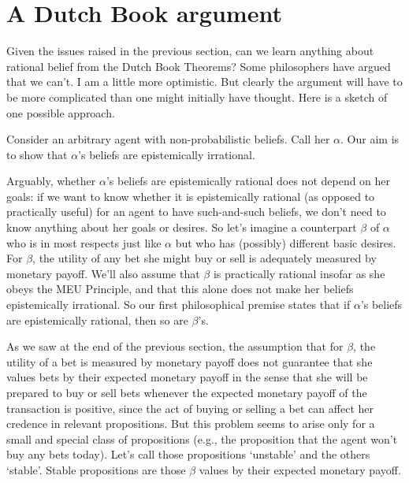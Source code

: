 \section{A Dutch Book argument}

Given the issues raised in the previous section, can we learn anything
about rational belief from the Dutch Book Theorems? Some philosophers
have argued that we can't. I am a little more optimistic. But clearly
the argument will have to be more complicated than one might initially
have thought. Here is a sketch of one possible approach.

Consider an arbitrary agent with non-probabilistic beliefs. Call her
$\alpha$. Our aim is to show that $\alpha$'s beliefs are
epistemically irrational. 

Arguably, whether $\alpha$'s beliefs are epistemically rational does
not depend on her goals: if we want to know whether it is
epistemically rational (as opposed to practically useful) for an agent
to have such-and-such beliefs, we don't need to know anything about
her goals or desires.  So let's imagine a counterpart $\beta$ of
$\alpha$ who is in most respects just like $\alpha$ but who has
(possibly) different basic desires. For $\beta$, the utility of any
bet she might buy or sell is adequately measured by monetary
payoff. We'll also assume that $\beta$ is practically rational insofar
as she obeys the MEU Principle, and that this alone does not make her
beliefs epistemically irrational. So our first philosophical premise
states that if $\alpha$'s beliefs are epistemically rational, then so
are $\beta$'s.

As we saw at the end of the previous section, the assumption that for
$\beta$, the utility of a bet is measured by monetary payoff does not
guarantee that she values bets by their expected monetary payoff in
the sense that she will be prepared to buy or sell bets whenever the
expected monetary payoff of the transaction is positive, since the act
of buying or selling a bet can affect her credence in relevant
propositions. But this problem seems to arise only for a small and
special class of propositions (e.g., the proposition that the agent
won't buy any bets today). Let's call those propositions `unstable'
and the others `stable'. Stable propositions are those $\beta$ values
by their expected monetary payoff.


